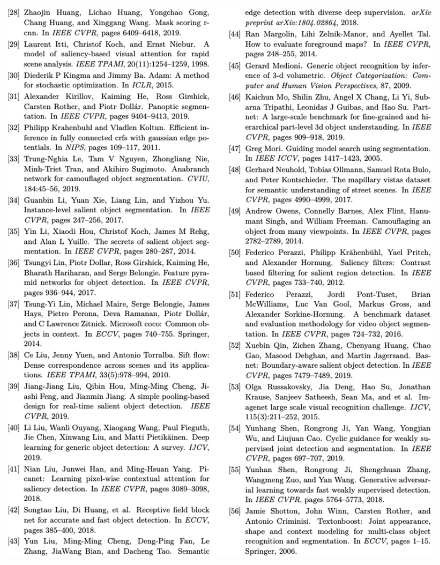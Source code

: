 \documentclass[final]{cvpr}
\begin{document}
\begin{figure}[tp]
    \centering
    \includegraphics[width=\textwidth]{COD_Zh_translate/figures/ref2.png}\small
\end{figure}
\end{document}
